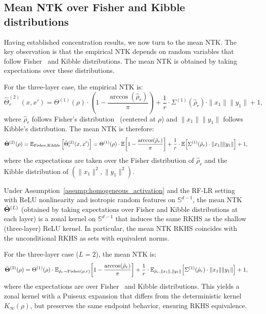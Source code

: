 \vspace{0.5em}
\subsection{Mean NTK over Fisher and Kibble distributions}\label{subsec:conditional-mean-ntk}
Having established concentration results, we now turn to the mean NTK. The key observation is that the empirical NTK depends on random variables that follow Fisher~\cite{fisher1915probable,hotelling1953new} and Kibble distributions. The mean NTK is obtained by taking expectations over these distributions.

For the three-layer case, the empirical NTK is:
\[
\hat{\Theta}^{(2)}_r(x,x') = \Theta^{(1)}(\rho) \cdot \left(1 - \frac{\arccos(\hat{\rho}_r)}{\pi}\right) + \frac{1}{r} \cdot \Sigma^{(1)}(\hat{\rho}_r) \cdot \|x_1\|\|y_1\| + 1,
\]
where \( \hat{\rho}_r \) follows Fisher's distribution~\cite{fisher1915probable,hotelling1953new} (centered at \( \rho \)) and \( \|x_1\|\|y_1\| \) follows Kibble's distribution. The mean NTK is therefore:
\[
\tilde{\boldsymbol{\Theta}}^{(2)}(\rho) = \mathbb{E}_{\text{Fisher}, \text{Kibble}}\left[\hat{\Theta}^{(2)}_r(x,x')\right] = \Theta^{(1)}(\rho) \cdot \mathbb{E}\!\left[1 - \frac{\arccos(\hat{\rho}_r)}{\pi}\right] + \frac{1}{r} \cdot \mathbb{E}\!\left[\Sigma^{(1)}(\hat{\rho}_r) \cdot \|x_1\|\|y_1\|\right] + 1,
\]
where the expectations are taken over the Fisher distribution of \( \hat{\rho}_r \) and the Kibble distribution of \( (\|x_1\|^2, \|y_1\|^2) \).

\begin{corollary}\label{cor:conditional_rkhs_homogeneous}
Under Assumption~\ref{assump:homogeneous_activation} and the RF-LR setting with ReLU nonlinearity and isotropic random features on \( \mathbb{S}^{d-1} \), the mean NTK \( \tilde{\boldsymbol{\Theta}}^{(L)} \) (obtained by taking expectations over Fisher and Kibble distributions at each layer) is a zonal kernel on \( \mathbb{S}^{d-1} \) that induces the same RKHS as the shallow (three-layer) ReLU kernel. In particular, the mean NTK RKHS coincides with the unconditional RKHS as sets with equivalent norms.

For the three-layer case (\( L=2 \)), the mean NTK is:
\[
\tilde{\boldsymbol{\Theta}}^{(2)}(\rho) = \Theta^{(1)}(\rho) \cdot \mathbb{E}_{\hat{\rho}_r \sim \text{Fisher}(\rho,r)}\!\left[1 - \frac{\arccos(\hat{\rho}_r)}{\pi}\right] + \frac{1}{r} \cdot \mathbb{E}_{\hat{\rho}_r, \|x_1\|, \|y_1\|}\!\left[\Sigma^{(1)}(\hat{\rho}_r) \cdot \|x_1\|\|y_1\|\right] + 1,
\]
where the expectations are over Fisher~\cite{fisher1915probable,hotelling1953new} and Kibble distributions. This yields a zonal kernel with a Puiseux expansion that differs from the deterministic kernel \( K_{\infty}(\rho) \), but preserves the same endpoint behavior, ensuring RKHS equivalence.
\end{corollary}


